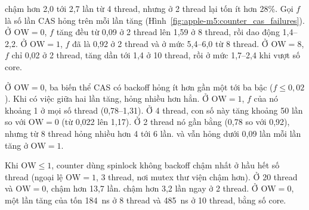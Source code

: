 
 chậm hơn  2,0 tới 2,7 lần từ 4 thread, nhưng ở 2 thread lại tốn ít hơn 28\%.
Gọi $f$ là số lần CAS hỏng trên mỗi lần tăng (Hình~\ref{fig:apple-m5:counter_cas_failures}). Ở
$\mathrm{OW} = 0$, $f$ tăng đều từ 0,09 ở 2 thread lên 1,59 ở 8 thread, rồi dao động 1,4--2,2. Ở
$\mathrm{OW} = 1$, $f$ đã là 0,92 ở 2 thread và ở mức 5,4--6,0 từ 8 thread. Ở $\mathrm{OW} = 8$, $f$ chỉ
0,02 ở 2 thread, tăng dần tới 1,4 ở 10 thread, rồi ở mức 1,7--2,4 khi vượt số core.


Ở $\mathrm{OW} = 0$, ba biến thể CAS có backoff hỏng ít hơn  gần một tới ba bậc ($f \le 0{,}02$).
Khi có việc giữa hai lần tăng,  hỏng nhiều hơn hẳn. Ở $\mathrm{OW} = 1$, $f$ của nó
khoảng 1 ở mọi số thread (0,78--1,31). Ở 4 thread, con số này tăng khoảng 50 lần so với
$\mathrm{OW} = 0$ (từ 0,022 lên 1,17). Ở 2 thread nó gần bằng  (0,78 so với 0,92), nhưng từ
8 thread  hỏng nhiều hơn 4 tới 6 lần.  và  vẫn hỏng
dưới 0,09 lần mỗi lần tăng ở $\mathrm{OW} = 1$.

Khi $\mathrm{OW} \le 1$, counter dùng spinlock không backoff chậm nhất ở hầu hết số thread (ngoại lệ
$\mathrm{OW} = 1$, 3 thread, nơi mutex thư viện chậm hơn). Ở 20 thread và $\mathrm{OW} = 0$,
 chậm hơn  13,7 lần.  chậm hơn  3,2 lần
ngay ở 2 thread. Ở $\mathrm{OW} = 0$, một lần tăng của  tốn 184~ns ở 8 thread và
485~ns ở 10 thread, bằng số core.

